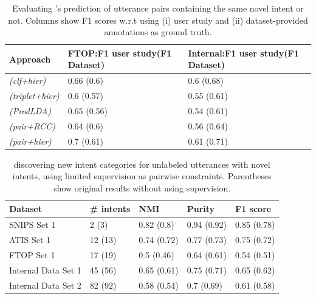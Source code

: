 \begin{table}[t]
\centering
\caption{Evaluating \mname{}'s prediction of utterance pairs containing the same novel intent or not. Columns show F1 scores w.r.t  using (i) user study and (ii) dataset-provided annotations as ground truth.}\smallskip
\begin{tabularx}{1.03\linewidth}{L{0.45}|L{0.78}|L{0.77}} \hline
  \textbf{Approach} & \textbf{FTOP:F1 user study(F1 Dataset)} & \textbf{Internal:F1 user study(F1 Dataset)} \\ \hline
  \mname{} \textit{(clf+hier)} & 0.66 (0.6) & 0.6 (0.68) \\ 
  \mname{} \textit{(triplet+hier)} & 0.6 (0.57) & 0.55 (0.61)  \\ 
  \mname{} \textit{(ProdLDA)} & 0.65 (0.56) & 0.54 (0.61)  \\ 
  \mname{} \textit{(pair+RCC)} & 0.64 (0.6) & 0.56 (0.64)  \\ 
  \mname{} \textit{(pair+hier)} & 0.7 (0.61) & 0.61 (0.71)  \\ 
\hline
\end{tabularx}
\label{tab:user study}
\end{table}


\begin{table}[t]
\centering
\caption{\mname{} discovering new intent categories for unlabeled utterances with novel intents, using limited supervision as pairwise constraints. Parentheses show original results without using supervision.}\smallskip
\begin{tabularx}{\linewidth}{L{0.445}|L{0.345}|L{0.41}|L{0.41}|L{0.39}} \hline
  \textbf{Dataset} & \textbf{\# intents} & \textbf{NMI} & \textbf{Purity} & \textbf{F1 score}
    \\%
    \hline
  SNIPS Set 1 & 2 (3) & 0.82 (0.8) & 0.94 (0.92) & 0.85 (0.78) \\ 
  ATIS Set 1 & 12 (13) & 0.74 (0.72) & 0.77 (0.73) & 0.75 (0.72)  \\ 
  FTOP Set 1 & 17 (19) & 0.5 (0.46) & 0.64 (0.61) & 0.54 (0.51)  \\ 
  Internal Data Set 1 & 45 (56) & 0.65 (0.61) & 0.75 (0.71)  &  0.65 (0.62) \\ 
  Internal Data Set 2 & 82 (92) & 0.58 (0.54) & 0.7 (0.69)  & 0.61 (0.58)  \\ 
\hline
\end{tabularx}
\label{tab:supervision}
\end{table}

